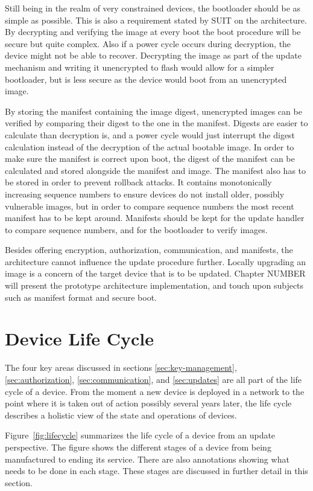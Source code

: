 \documentclass[0-thesis.tex]{subfiles}
\begin{document}
Still being in the realm of very constrained devices, the bootloader should be as simple
as possible. This is also a requirement stated by SUIT on the architecture. By decrypting
and verifying the image at every boot the boot procedure will be secure but
quite complex. Also if a power cycle occurs during decryption, the device might not be
able to recover. Decrypting the image as part of the update mechanism and writing it
unencrypted to flash would allow for a simpler bootloader, but is less secure as the
device would boot from an unencrypted image.

By storing the manifest containing the image digest, unencrypted images can be verified by
comparing their digest to the one in the manifest. Digests are easier to calculate than
decryption is, and a power cycle would just interrupt the digest calculation instead of
the decryption of the actual bootable image. In order to make sure the manifest is correct
upon boot, the digest of the manifest can be calculated and stored alongside the manifest
and image. The manifest also has to be stored in order to prevent rollback attacks. It
contains monotonically increasing sequence numbers to ensure devices do not install older,
possibly vulnerable images, but in order to compare sequence numbers the most recent
manifest has to be kept around. Manifests should be kept for the update handler to compare
sequence numbers, and for the bootloader to verify images.

Besides offering encryption, authorization, communication, and manifests, the architecture
cannot influence the update procedure further. Locally upgrading an image is a concern of
the target device that is to be updated. Chapter NUMBER will present the prototype
architecture implementation, and touch upon subjects such as manifest format and secure
boot.

\section{Device Life Cycle}
\label{sec:device-lifecycle}
The four key areas discussed in sections \ref{sec:key-management},
\ref{sec:authorization}, \ref{sec:communication}, and \ref{sec:updates} are all part of
the life cycle of a device. From the moment a new device is deployed in a network to the
point where it is taken out of action possibly several years later, the life cycle
describes a holistic view of the state and operations of devices.

Figure~\ref{fig:lifecycle} summarizes the life cycle of a device from an update
perspective. The figure shows the different stages of a device from being manufactured to
ending its service. There are also annotations showing what needs to be done in each
stage. These stages are discussed in further detail in this section.
\end{document}
